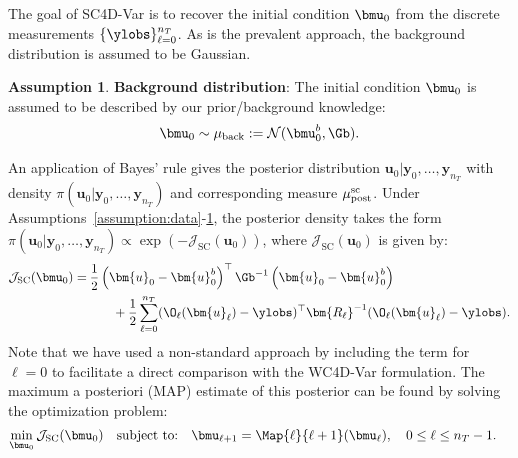 \documentclass{aims} %
\theoremstyle{definition}
\newtheorem{assumption}{Assumption}
\begin{document}
The goal of SC4D-Var is to recover the initial condition $\bmu_0$ from the discrete measurements 
$\{ \ylobs\}_{\ell = 0}^{n_T}$. 
%
As is the prevalent approach, the background distribution is assumed to be Gaussian. 
\begin{assumption} \label{assumption:background_distribution}
\textbf{Background distribution}:
The initial condition $\bmu_0$ is assumed to be described by our prior/background knowledge:
\begin{align}
\bmu_0  \sim \mu_{\rm back} := \mathcal{N}( \bmu_0^{b}, \Gb).\label{def:u_0_assumptions}
 \end{align}
\end{assumption}
An application of Bayes' rule gives the posterior distribution $\bm{u}_0| \bm{y}_{0}, \dots, \bm{y}_{n_T}$ with density $\pi(\bm{u}_0| \bm{y}_{0}, \dots ,\bm{y}_{n_T})$ and corresponding measure $\mu_{\rm post}^{\rm{sc}}$. Under Assumptions~\ref{assumption:data}-\ref{assumption:background_distribution}, the posterior density takes the form $\pi(\bm{u}_0| \bm{y}_{0}, \dots, \bm{y}_{n_T}) \propto \exp(- \mathcal{J}_{\text{SC}}(\bm{u}_0))$, where $\mathcal{J}_{\text{SC}}(\bm{u}_0)$ is given by:
\begin{align*}
\mathcal{J}_{\text{SC}}(\bmu_0) = & \>  \frac{1}{2} \left( \bm{u}_0 - \bm{u}^{b}_0 \right)^\top {\Gb^{-1}} \left( \bm{u}_0 - \bm{u}^{b}_0 \right) \\
  & \qquad + \frac{1}{2} 
  \sum_{\ell = 0}^{n_T} (\O_\ell(\bm{u}_\ell) - \ylobs)^\top \bm{R_\ell}^{-1} (\O_\ell(\bm{u}_\ell) - \ylobs).
\end{align*}  
%
 Note that we have used a non-standard approach by including the term for $\ell = 0$ to facilitate a direct comparison with the WC4D-Var formulation.
 The maximum a posteriori (MAP) estimate of this posterior can be found by solving the optimization problem:
\begin{align*}
\min_{\bmu_0} \mathcal{J}_{\text{SC}}(\bmu_0) &\quad \text{subject to:} \quad \bmu_{\ell + 1} = \Map{\ell}{{\ell + 1}} (\bmu_\ell), \quad 0 \le \ell \le n_T -1.
\end{align*}
\end{document}
